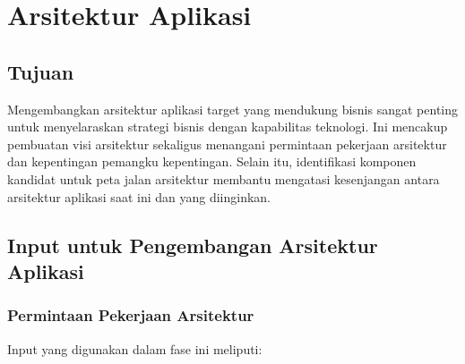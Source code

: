 \chapter{Arsitektur Aplikasi}

\section{Tujuan}
Mengembangkan arsitektur aplikasi target yang mendukung bisnis sangat penting untuk menyelaraskan strategi bisnis dengan kapabilitas teknologi. Ini mencakup pembuatan visi arsitektur sekaligus menangani permintaan pekerjaan arsitektur dan kepentingan pemangku kepentingan. Selain itu, identifikasi komponen kandidat untuk peta jalan arsitektur membantu mengatasi kesenjangan antara arsitektur aplikasi saat ini dan yang diinginkan.

\section{Input untuk Pengembangan Arsitektur Aplikasi}

\subsection{Permintaan Pekerjaan Arsitektur}
Input yang digunakan dalam fase ini meliputi:

